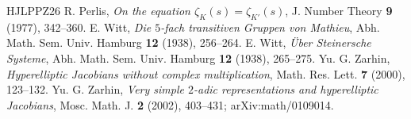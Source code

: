 \documentclass[11pt]{amsart}
\theoremstyle{definition}
\begin{document}
\begin{thebibliography}{HJLPPZ26}
 R. Perlis, \emph{On the equation $\zeta_K(s)=\zeta_{K'}(s)$}, J. Number Theory \textbf{9} (1977), 342--360.
 E. Witt, \emph{Die $5$-fach transitiven Gruppen von Mathieu}, Abh. Math. Sem. Univ. Hamburg \textbf{12} (1938), 256--264.
 E. Witt, \emph{\"Uber Steinersche Systeme}, Abh. Math. Sem. Univ. Hamburg \textbf{12} (1938), 265--275.
 Yu. G. Zarhin, \emph{Hyperelliptic Jacobians without complex multiplication}, Math. Res. Lett. \textbf{7} (2000), 123--132.
 Yu. G. Zarhin, \emph{Very simple $2$-adic representations and hyperelliptic Jacobians}, Mosc. Math. J. \textbf{2} (2002), 403--431; arXiv:math/0109014.
\end{thebibliography}
\end{document}
